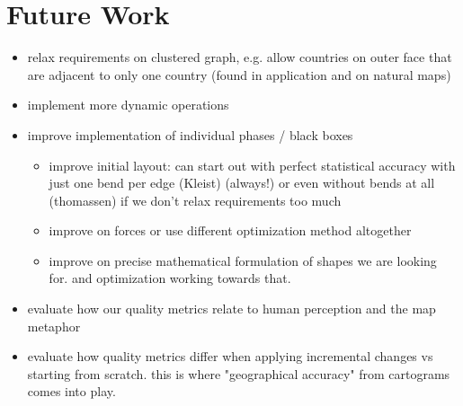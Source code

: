 \chapter{Future Work}
\label{chap:future-work}

\begin{itemize}
	\item relax requirements on clustered graph, e.g. allow countries on outer face that are adjacent to only one country (found in application and on natural maps)
	\item implement more dynamic operations
	\item improve implementation of individual phases / black boxes \begin{itemize}
		\item improve initial layout: can start out with perfect statistical accuracy with just one bend per edge (Kleist) (always!) or even without bends at all (thomassen) if we don't relax requirements too much
		\item improve on forces or use different optimization method altogether
		\item improve on precise mathematical formulation of shapes we are looking for. and optimization working towards that.
	\end{itemize}
	\item evaluate how our quality metrics relate to human perception and the map metaphor
	\item evaluate how quality metrics differ when applying incremental changes vs starting from scratch. this is where "geographical accuracy" from cartograms comes into play.
\end{itemize}
